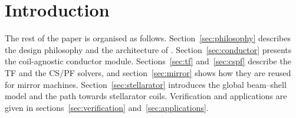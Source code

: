 \section{Introduction}
\label{sec:intro}



The rest of the paper is organised as follows.
Section~\ref{sec:philosophy} describes the design philosophy and the
architecture of \MADE{}. Section~\ref{sec:conductor} presents the
coil-agnostic conductor module. Sections~\ref{sec:tf}
and~\ref{sec:cspf} describe the TF and the CS/PF solvers, and
section~\ref{sec:mirror} shows how they are reused for mirror machines.
Section~\ref{sec:stellarator} introduces the global beam--shell model and
the path towards stellarator coils. Verification and applications are
given in sections~\ref{sec:verification} and~\ref{sec:applications}.
